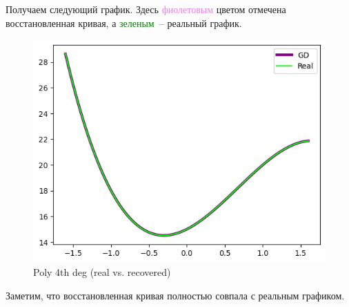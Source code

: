 \documentclass[12pt, a4paper, oneside, final]{article}
\begin{document}
	Получаем следующий график.
	Здесь \textcolor{violet}{фиолетовым} цветом отмечена восстановленная кривая, а \textcolor{green}{зеленым}~-- реальный график.
	\begin{figure}[H]
		\centering
		\includegraphics[scale = 1]{Image/AT1_POLY_4TH_DEG.png}
		\caption*{Poly 4th deg (real vs. recovered)}
	\end{figure}
	Заметим, что восстановленная кривая полностью совпала с реальным графиком.
\end{document}
